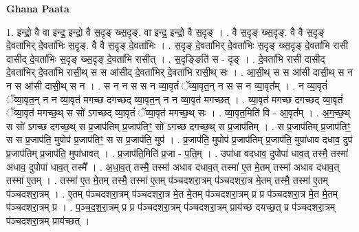\documentclass[17pt]{extarticle}
\begin{document}
\textbf{Ghana Paata } \newline

1. इन्द्रो॒ वै वा इन्द्र॒ इन्द्रो॒ वै स॒दृङ् ख्स॒दृङ्. वा इन्द्र॒ इन्द्रो॒ वै स॒दृङ् । . वै स॒दृङ् ख्स॒दृङ्. वै वै स॒दृङ् दे॒वता॑भिर् दे॒वता॑भिः स॒दृङ्. वै वै स॒दृङ् दे॒वता॑भिः । . स॒दृङ् दे॒वता॑भिर् दे॒वता॑भिः स॒दृङ् ख्स॒दृङ् दे॒वता॑भि रासी दासीद् दे॒वता॑भिः स॒दृङ् ख्स॒दृङ् दे॒वता॑भि रासीत् । . स॒दृङ्ङिति॑ स - दृङ् । . दे॒वता॑भि रासी दासीद् दे॒वता॑भिर् दे॒वता॑भि रासी॒थ् स स आ॑सीद् दे॒वता॑भिर् दे॒वता॑भि रासी॒थ् सः । . आ॒सी॒थ् स स आ॑सी दासी॒थ् स न न स आ॑सी दासी॒थ् स न । . स न न स स न व्या॒वृतं॑ ॅव्या॒वृत॒न् न स स न व्या॒वृत᳚म् । . न व्या॒वृतं॑ ॅव्या॒वृत॒न् न न व्या॒वृत॑ मगच्छ दगच्छद् व्या॒वृत॒न् न न व्या॒वृत॑ मगच्छत् । . व्या॒वृत॑ मगच्छ दगच्छद् व्या॒वृतं॑ ॅव्या॒वृत॑ मगच्छ॒थ् स सो॑ ऽगच्छद् व्या॒वृतं॑ ॅव्या॒वृत॑ मगच्छ॒थ् सः । . व्या॒वृत॒मिति॑ वि - आ॒वृत᳚म् । . अ॒ग॒च्छ॒थ् स सो॑ ऽगच्छ दगच्छ॒थ् स प्र॒जाप॑तिम् प्र॒जाप॑तिꣳ॒॒ सो॑ ऽगच्छ दगच्छ॒थ् स प्र॒जाप॑तिम् । . स प्र॒जाप॑तिम् प्र॒जाप॑तिꣳ॒॒ स स प्र॒जाप॑ति॒ मुपोप॑ प्र॒जाप॑तिꣳ॒॒ स स प्र॒जाप॑ति॒ मुप॑ । . प्र॒जाप॑ति॒ मुपोप॑ प्र॒जाप॑तिम् प्र॒जाप॑ति॒ मुपा॑धाव दधाव॒ दुप॑ प्र॒जाप॑तिम् प्र॒जाप॑ति॒ मुपा॑धावत् । . प्र॒जाप॑ति॒मिति॑ प्र॒जा - प॒ति॒म् । . उपा॑धा वदधाव॒ दुपोपा॑ धाव॒त् तस्मै॒ तस्मा॑ अधाव॒ दुपोपा॑ धाव॒त् तस्मै᳚ । . अ॒धा॒व॒त् तस्मै॒ तस्मा॑ अधाव दधाव॒त् तस्मा॑ ए॒त मे॒तम् तस्मा॑ अधाव दधाव॒त् तस्मा॑ ए॒तम् । . तस्मा॑ ए॒त मे॒तम् तस्मै॒ तस्मा॑ ए॒तम् प॑ञ्चदशरा॒त्रम् प॑ञ्चदशरा॒त्र मे॒तम् तस्मै॒ तस्मा॑ ए॒तम् प॑ञ्चदशरा॒त्रम् । . ए॒तम् प॑ञ्चदशरा॒त्रम् प॑ञ्चदशरा॒त्र मे॒त मे॒तम् प॑ञ्चदशरा॒त्रम् प्र प्र प॑ञ्चदशरा॒त्र मे॒त मे॒तम् प॑ञ्चदशरा॒त्रम् प्र । . प॒ञ्च॒द॒श॒रा॒त्रम् प्र प्र प॑ञ्चदशरा॒त्रम् प॑ञ्चदशरा॒त्रम् प्राय॑च्छ दयच्छ॒त् प्र प॑ञ्चदशरा॒त्रम् प॑ञ्चदशरा॒त्रम् प्राय॑च्छत् । \newline
\end{document}
